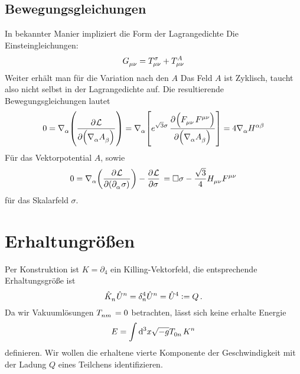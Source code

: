 \subsection{Bewegungsgleichungen}
In bekannter Manier impliziert die Form der Lagrangedichte 
Die Einsteingleichungen:
\begin{equation}
\tensor{G}{_\mu_\nu}=\tensor*{T}{*^{\sigma}_\mu_\nu}+\tensor*{T}{*^{A}*_\mu*_\nu}
\end{equation}
Weiter erhält man für die Variation nach den $A$ 
Das Feld $A$ ist Zyklisch, taucht also nicht selbst in der Lagrangedichte auf.
Die resultierende Bewegungsgleichungen lautet
\begin{equation}
0=\tensor{\nabla}{_\alpha}\left(\dpd{\mathcal{L}}{\left(\tensor{\nabla}{_\alpha}\tensor{A}{_\beta}\right)}\right)
=\tensor{\nabla}{_\alpha}\left[e^{\sqrt{3}\sigma}\dpd{\left(\tensor{F}{_\mu_\nu}\tensor{F}{^\mu^\nu}\right)}{\left(\tensor{\nabla}{_\alpha}\tensor{A}{_\beta}\right)}\right]
=4\tensor{\nabla}{_\alpha}\tensor{H}{^\alpha^\beta}
 \end{equation}
 Für das Vektorpotential $A$, sowie
 \begin{equation}
0=\tensor{\nabla}{_\alpha}\left(\dpd{\mathcal{L}}{\left(\tensor{\partial}{_\alpha}\sigma\right)}\right)
-\dpd{\mathcal{L}}{\sigma}\\
=\square \sigma
-\frac{\sqrt{3}}{4}\tensor*{H}{_\mu_\nu}\tensor*{F}{^\mu^\nu}
\label{eq:dymdilat}
 \end{equation}
 für das Skalarfeld $\sigma$. 
\section{Erhaltungrößen}
Per Konstruktion ist $K=\partial_4$ ein Killing-Vektorfeld, die entsprechende
Erhaltungsgröße ist 
\begin{equation}
\tensor{\hat{K}}{_n}\tensor{\hat{U}}{^n}=\tensor*{\delta}{^4_n}\tensor{\hat{U}}{^n}
=\tensor{\hat{U}}{^4}:=Q\,.
\end{equation}
Da wir Vakuumlösungen $\tensor{T}{_n_m}=0$ betrachten, lässt sich keine erhalte
Energie 
\begin{equation}
E=\int\dif{}^3x \sqrt{-g} \tensor{T}{_0_n}\tensor{K}{^n}
\end{equation}
definieren. Wir wollen die erhaltene vierte Komponente der Geschwindigkeit mit 
der Ladung $Q$ eines Teilchens identifizieren.
